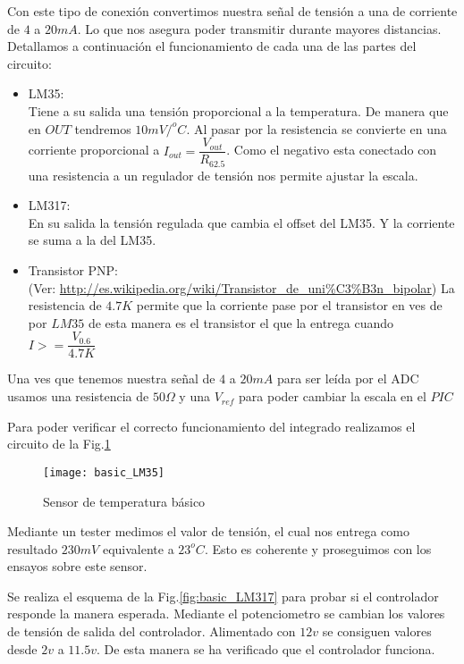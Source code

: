 Con este tipo de conexión convertimos nuestra señal de tensión a una de corriente de $4$ a $20mA$.
Lo que nos asegura poder transmitir durante mayores distancias.
Detallamos a continuación el funcionamiento de cada una de las partes del circuito:
\begin{itemize}
 \item LM35:\\ 
    Tiene a su salida una tensión proporcional a la temperatura. De manera que en $OUT$
    tendremos $10mV/^oC$. Al pasar por la resistencia se convierte en una corriente 
    proporcional a $I_{out}=\dfrac{V_{out}}{R_{62.5}}$. Como el negativo esta conectado
    con una resistencia a un regulador de tensión nos permite ajustar la escala. 
 \item LM317: \\
    En su salida la tensión regulada que cambia el offset del LM35. Y la corriente se suma
    a la del LM35. 
 \item Transistor PNP:\\
    (Ver: \url{http://es.wikipedia.org/wiki/Transistor_de_uni%C3%B3n_bipolar})
    La resistencia de $4.7K$ permite que la corriente pase por el transistor en ves de por $LM35$
    de esta manera es el transistor el que la entrega cuando $I>=\dfrac{V_{0.6}}{4.7K}$
\end{itemize}
Una ves que tenemos nuestra señal de $4$ a $20mA$ para ser leída por el ADC usamos una resistencia 
de $50 \Omega$ y una $V_{ref}$ para poder cambiar la escala en el $PIC$

Para poder verificar el correcto funcionamiento del integrado realizamos el circuito
de la Fig.\ref{fig:basic_LM35}
\begin{figure}[H] %
  \begin{center}
  \texttt{[image: basic\_LM35]}
  \end{center}
  \caption{Sensor de temperatura básico}
  \label{fig:basic_LM35}
\end{figure}


Mediante un tester medimos el valor de tensión, el cual nos entrega como resultado 
$230mV$ equivalente a $23^oC$. Esto es coherente y proseguimos con los ensayos sobre este
sensor.

Se realiza el esquema de la Fig.\ref{fig:basic_LM317} para probar si el
controlador responde la manera esperada. Mediante el potenciometro se cambian los valores
de tensión de salida del controlador. Alimentado con $12v$ se consiguen valores desde
$2v$ a $11.5v$. De esta manera se ha verificado que el controlador funciona.

